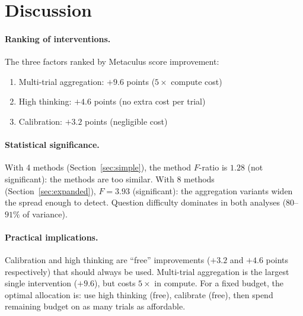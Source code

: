 \documentclass[11pt]{article}
\begin{document}
\section{Discussion}

\paragraph{Ranking of interventions.}
The three factors ranked by Metaculus score improvement:
\begin{enumerate}
  \item Multi-trial aggregation: $+9.6$ points ($5\times$ compute cost)
  \item High thinking: $+4.6$ points (no extra cost per trial)
  \item Calibration: $+3.2$ points (negligible cost)
\end{enumerate}

\paragraph{Statistical significance.}
With 4 methods (Section~\ref{sec:simple}), the method $F$-ratio is $1.28$
(not significant): the methods are too similar.
With 8 methods (Section~\ref{sec:expanded}), $F = 3.93$ (significant):
the aggregation variants widen the spread enough to detect.  Question
difficulty dominates in both analyses ($80$--$91\%$ of variance).

\paragraph{Practical implications.}
Calibration and high thinking are ``free'' improvements ($+3.2$ and $+4.6$
points respectively) that should always be used.  Multi-trial aggregation
is the largest single intervention ($+9.6$), but costs $5\times$ in compute.
For a fixed budget, the optimal allocation is: use high thinking (free),
calibrate (free), then spend remaining budget on as many trials as
affordable.
\end{document}
